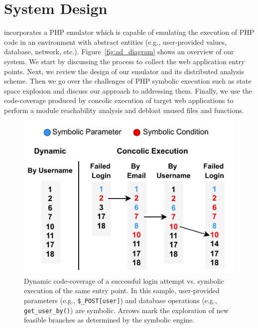 \section{System Design} 
\animatedead{} incorporates a PHP emulator which is capable of emulating the execution of PHP code in an environment with abstract entities (e.g., user-provided values, database, network, etc.). 
Figure~\ref{fig:ad_diagram} shows an overview of our system. 
We start by discussing the process to collect the web application entry points. 
Next, we review the design of our emulator and its distributed analysis scheme. 
Then we go over the challenges of PHP symbolic execution such as state space explosion and discuss our approach to addressing them. 
Finally, we use the code-coverage produced by concolic execution of target web applications to perform a module reachability analysis and debloat unused files and functions. 

\begin{figure}[t]
	\centering
	\vspace*{-0.9em}
	\includegraphics[width=0.75\columnwidth]{figures/ad/code_sample_concolic.pdf}
	\caption{Dynamic code-coverage of a successful login attempt vs. symbolic execution of the same entry point. In this sample, user-provided parameters (e.g., \texttt{\$\_POST[\textquotesingle{}user\textquotesingle{}]}) and database operations (e.g., \texttt{get\_user\_by()}) are symbolic. Arrows mark the exploration of new feasible branches as determined by the symbolic engine.}
	\label{fig:concolic_coverage}
\end{figure}

